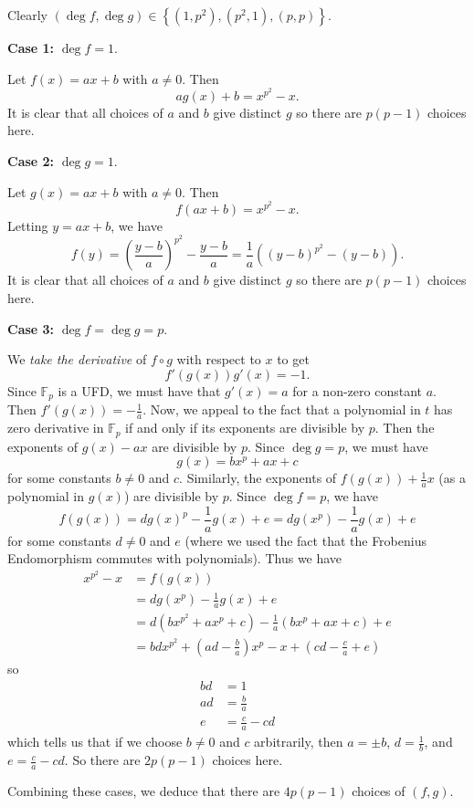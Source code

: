 Clearly $\left(\deg f,\deg g\right)\in\left\{\left(1,p^2\right),\left(p^2,1\right),\left(p,p\right)\right\}$.

\textbf{Case 1:} $\deg f=1$.

Let $f\left(x\right)=ax+b$ with $a\neq0$. Then \[ag\left(x\right)+b=x^{p^2}-x.\] It is clear that all choices of $a$ and $b$ give distinct $g$ so there are $p\left(p-1\right)$ choices here.

\textbf{Case 2:} $\deg g=1$.

Let $g\left(x\right)=ax+b$ with $a\neq0$. Then \[f\left(ax+b\right)=x^{p^2}-x.\] Letting $y=ax+b$, we have \[f\left(y\right)=\left(\frac{y-b}{a}\right)^{p^2}-\frac{y-b}{a}=\frac{1}{a}\left(\left(y-b\right)^{p^2}-\left(y-b\right)\right).\] It is clear that all choices of $a$ and $b$ give distinct $g$ so there are $p\left(p-1\right)$ choices here.

\textbf{Case 3:} $\deg f=\deg g=p$.

We \emph{take the derivative} of $f\circ g$ with respect to $x$ to get \[f'\left(g\left(x\right)\right)g'\left(x\right)=-1.\] Since $\mathbb{F}_p$ is a UFD, we must have that $g'\left(x\right)=a$ for a non-zero constant $a$. Then $f'\left(g\left(x\right)\right)=-\frac{1}{a}$. Now, we appeal to the fact that a polynomial in $t$ has zero derivative in $\mathbb{F}_p$ if and only if its exponents are divisible by $p$. Then the exponents of $g\left(x\right)-ax$ are divisible by $p$. Since $\deg g=p$, we must have \[g\left(x\right)=bx^p+ax+c\] for some constants $b\neq0$ and $c$. Similarly, the exponents of $f\left(g\left(x\right)\right)+\frac{1}{a}x$ (as a polynomial in $g\left(x\right)$) are divisible by $p$. Since $\deg f=p$, we have \[f\left(g\left(x\right)\right)=dg\left(x\right)^p-\frac{1}{a}g\left(x\right)+e=dg\left(x^p\right)-\frac{1}{a}g\left(x\right)+e\] for some constants $d\neq0$ and $e$ (where we used the fact that the Frobenius Endomorphism commutes with polynomials). Thus we have
\begin{align*}
	x^{p^2}-x&=f\left(g\left(x\right)\right)\\
	&=dg\left(x^p\right)-\frac{1}{a}g\left(x\right)+e\\
	&=d\left(bx^{p^2}+ax^p+c\right)-\frac{1}{a}\left(bx^p+ax+c\right)+e\\
	&=bdx^{p^2}+\left(ad-\frac{b}{a}\right)x^p-x+\left(cd-\frac{c}{a}+e\right)
\end{align*}
so
\begin{align*}
	bd&=1\\
	ad&=\frac{b}{a}\\
	e&=\frac{c}{a}-cd
\end{align*}
which tells us that if we choose $b\neq0$ and $c$ arbitrarily, then $a=\pm b$, $d=\frac{1}{b}$, and $e=\frac{c}{a}-cd$. So there are $2p\left(p-1\right)$ choices here.

Combining these cases, we deduce that there are $\boxed{4p\left(p-1\right)}$ choices of $\left(f,g\right)$.